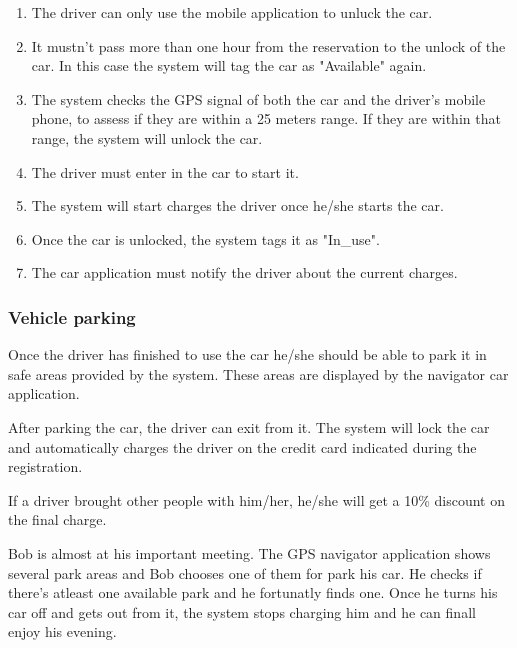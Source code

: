 \begin{enumerate}
	\item The driver can only use the mobile application to unluck the car. 
	\item It mustn't pass more than one hour from the reservation to the 
	unlock of the car. In this case the system will tag the car as "Available" again.\label{f-reservationcanc}
	\item The system checks the GPS signal of both the car and the driver's mobile phone, to assess if they are within a 25 meters range. If they are within that range, the system will unlock the car. \label{f-nearby}
	\item The driver must enter in the car to start it.
	\item The system will start charges the driver once he/she starts the car.
	\item Once the car is unlocked, the system tags it as "In\_use".
	\item The car application must notify the driver about the current charges.
\end{enumerate}

\subsubsection{Vehicle parking}


Once the driver has finished to use the car he/she should be able to park it in safe areas provided by the system. These areas are displayed by the navigator car application.

After parking the car, the driver can exit from it. The system will lock the car and automatically charges the driver on the credit card indicated during the registration.

If a driver brought other people with him/her, he/she will get a 10\% discount on the final charge.


Bob is almost at his important meeting. The GPS navigator application shows several park areas and Bob chooses one of them for park his car. He checks if there's atleast one available park and he fortunatly finds one. Once he turns his car off and gets out from it, the system stops charging him and he can finall enjoy his evening.

